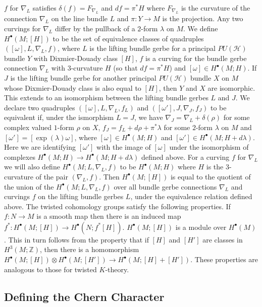 \documentclass[a4paper,reqno]{amsart}
\theoremstyle{plain}
\theoremstyle{definition}
\theoremstyle{remark}
\numberwithin{equation}{section}
\numberwithin{figure}{section}
\newcommand{\cH}{{\mathcal H}}
\newcommand{\<}{\langle}
\renewcommand{\>}{\rangle}
\begin{document}
$f$ for $\nabla_L$ satisfies $\delta(f) = F_{\nabla_L}$ 
and $df = \pi^*H$ where $F_{\nabla_L}$ is the curvature of the 
connection $\nabla_L$ on the line bundle $L$ and $\pi\colon 
Y\to M$ is the projection.  Any two curvings for 
$\nabla_L$ differ by the pullback of a $2$-form $\lambda$ 
on $M$.  We define $H^\bullet(M;[H])$ to be the set 
of equivalence classes of quadruples $([\omega],L,\nabla_L,f)$, 
where $L$ is the lifting bundle gerbe for a 
principal $PU(\cH)$ bundle $Y$ with Dixmier-Douady 
class $[H]$, 
$f$ is a curving for the bundle gerbe 
connection $\nabla_L$ with $3$-curvature 
$H$ (so that $df = \pi^*H$) and $[\omega] \in H^\bullet(M;H)$.  
If $J$ is the lifting bundle gerbe for another principal 
$PU(\cH)$ bundle $X$ on $M$ whose Dixmier-Douady class 
is also equal to $[H]$, then $Y$ and $X$ are isomorphic.  
This extends to an isomorphism between the lifting 
bundle gerbes $L$ and $J$.  We declare 
two quadruples $([\omega],L,\nabla_L,f_L)$ 
and $([\omega'],J,\nabla_J,f_J)$ 
to be equivalent if, under the ismorphism 
$L = J$, we have $\nabla_J = \nabla_L + \delta(\rho)$ 
for some complex valued $1$-form $\rho$ on $X$,   
$f_J = f_L + d\rho + \pi^*\lambda$ for some 
$2$-form $\lambda$ on $M$  
and $[\omega'] = [\exp(\lambda)\omega]$, where 
$[\omega] \in H^\bullet(M;H)$ and $[\omega'] \in 
H^\bullet(M;H+d\lambda)$.  Here we are identifying 
$[\omega']$ with the image of $[\omega]$ under the isomorphism 
of complexes $H^\bullet(M;H) \to H^\bullet(M;H+d\lambda)$ 
defined above.  For a curving $f$ for 
$\nabla_L$ we will also define $H^\bullet(M;L,\nabla_L,f)$ to 
be $H^\bullet(M;H)$ where $H$ is the $3$-curvature 
of the pair $(\nabla_L,f)$.  Then $H^\bullet(M;[H])$ 
is equal to the quotient of the union of the $H^\bullet(M;L,\nabla_L,f)$ 
over all bundle gerbe connections $\nabla_L$ and curvings $f$ 
on the lifting bundle gerbes $L$,    
under the equivalence relation defined above.  The twisted cohomology 
groups satisfy the following properties.  If 
$f\colon N\to M$ is a smooth map then there is an 
induced map $f^*\colon H^\bullet(M;[H]) \to 
H^\bullet(N;f^*[H])$.  $H^\bullet(M;[H])$ is a module 
over $H^\bullet(M)$.  This in turn follows from the 
property that if $[H]$ and $[H']$ are classes in 
$H^3(M;\mathbb{Z})$, then there is a homomorphism 
$H^\bullet(M;[H])\otimes H^\bullet(M;[H'])\to 
H^\bullet(M;[H]+[H'])$.  These properties are 
analogous to those for twisted $K$-theory.    

\subsection{Defining the Chern Character} 
\end{document}
